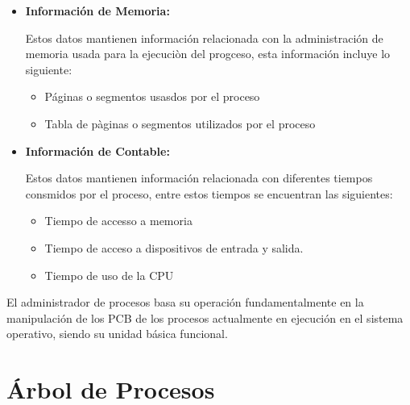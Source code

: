 \documentclass[12pt, fleqn]{report}                             %
\begin{document}
\begin{itemize}
                \clearpage

                \item
                    \textbf{Información de Memoria:}

                        Estos datos mantienen información relacionada con la administración de memoria
                        usada para la ejecuciòn del progceso, esta información incluye lo siguiente:

                        \begin{itemize}
                            \item Páginas o segmentos usasdos por el proceso
                            \item Tabla de pàginas o segmentos utilizados por el proceso 
                        \end{itemize}
                
                \item
                    \textbf{Información de Contable:}
                    
                        Estos datos mantienen información relacionada con diferentes tiempos consmidos por
                        el proceso, entre estos tiempos se encuentran las siguientes: 
                        \begin{itemize}
                            \item Tiempo de accesso a memoria 
                            \item Tiempo de acceso a dispositivos de entrada y salida.
                            \item Tiempo de uso de la CPU
                        \end{itemize}

                \end{itemize}

                El administrador de procesos basa su operación fundamentalmente en la manipulación de los PCB
                de los procesos actualmente en ejecución en el sistema operativo, siendo su unidad básica funcional.
        

        \clearpage
        \section{Árbol de Procesos}
\end{document}
